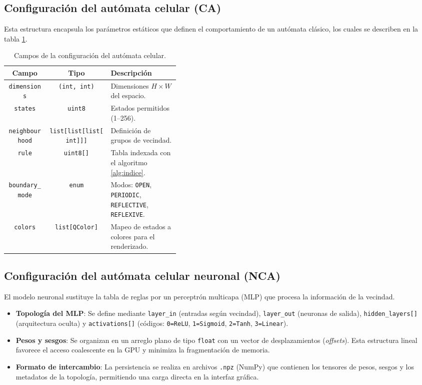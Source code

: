 \subsection{Configuración del autómata celular (CA)}

Esta estructura encapsula los parámetros estáticos que definen el comportamiento de un autómata clásico, los cuales se describen en la tabla \ref{tab:config_ca}.

\begin{table}[H]
	\centering
	\begin{tabular}{c|c | p{0.40\linewidth}}
		\hline
		\textbf{Campo} & \textbf{Tipo} & \textbf{Descripción} \\
		\hline 
		\texttt{dimensions} & \texttt{(int, int)} & Dimensiones $H \times W$ del espacio. \\ \hline 
		\texttt{states} & \texttt{uint8} & Estados permitidos (1--256). \\ \hline 
		\texttt{neighbourhood} & \texttt{list[list[list[int]]]} & Definición de grupos de vecindad. \\ \hline 
		\texttt{rule} & \texttt{uint8[]} & Tabla indexada con el algoritmo \ref{alg:indice}. \\ \hline 
		\texttt{boundary\_mode} & \texttt{enum} & Modos: \texttt{OPEN}, \texttt{PERIODIC}, \texttt{REFLECTIVE}, \texttt{REFLEXIVE}. \\ \hline 
		\texttt{colors} & \texttt{list[QColor]} & Mapeo de estados a colores para el renderizado. \\
	\end{tabular}
	\caption{Campos de la configuración del autómata celular.}
	\label{tab:config_ca}
\end{table}

\subsection{Configuración del autómata celular neuronal (NCA)}

El modelo neuronal sustituye la tabla de reglas por un perceptrón multicapa (MLP) que procesa la información de la vecindad.

\begin{itemize}
	\item \textbf{Topología del MLP}: Se define mediante \texttt{layer\_in} (entradas según vecindad), \texttt{layer\_out} (neuronas de salida), \texttt{hidden\_layers[]} (arquitectura oculta) y \texttt{activations[]} (códigos: \texttt{0=ReLU}, \texttt{1=Sigmoid}, \texttt{2=Tanh}, \texttt{3=Linear}).
	
	\item \textbf{Pesos y sesgos}: Se organizan en un arreglo plano de tipo \texttt{float} con un vector de desplazamientos (\textit{offsets}). Esta estructura lineal favorece el acceso coalescente en la GPU y minimiza la fragmentación de memoria.
	
	\item \textbf{Formato de intercambio}: La persistencia se realiza en archivos \texttt{.npz} (NumPy) que contienen los tensores de pesos, sesgos y los metadatos de la topología, permitiendo una carga directa en la interfaz gráfica.
\end{itemize}

